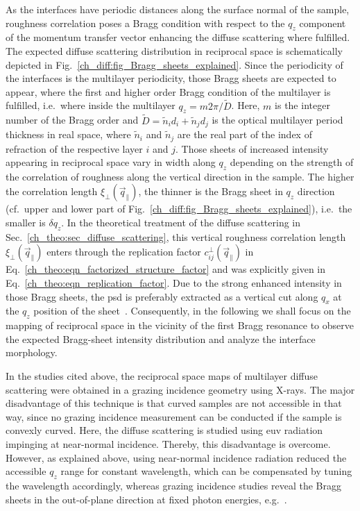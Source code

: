 As the interfaces have periodic distances along the surface normal of the sample, roughness correlation poses a Bragg condition with respect to the $q_z$ component of the momentum transfer vector enhancing the diffuse scattering where fulfilled. The expected diffuse scattering distribution in reciprocal space is schematically depicted in Fig.~\ref{ch_diff:fig_Bragg_sheets_explained}. Since the periodicity of the interfaces is the multilayer periodicity, those Bragg sheets are expected to appear, where the first and higher order Bragg condition of the multilayer is fulfilled, i.e.~where inside the multilayer $q_z=m 2 \pi /\tilde{D}$. Here, $m$ is the integer number of the Bragg order and $\tilde{D} = \tilde{n}_i d_i + \tilde{n}_j d_j$ is the optical multilayer period thickness in real space, where $\tilde{n}_i$ and $\tilde{n}_j$ are the real part of the index of refraction of the respective layer $i$ and $j$. Those sheets of increased intensity appearing in reciprocal space vary in width along $q_z$ depending on the strength of the correlation of roughness along the vertical direction in the sample. The higher the correlation length $\xi_\perp(\vec{q}_\parallel)$, the thinner is the Bragg sheet in $q_z$ direction (cf.~upper and lower part of Fig.~\ref{ch_diff:fig_Bragg_sheets_explained}), i.e.~the smaller is $\delta q_z$. In the theoretical treatment of the diffuse scattering in Sec.~\ref{ch_theo:sec_diffuse_scattering}, this vertical roughness correlation length $\xi_\perp(\vec{q}_\parallel)$ enters through the replication factor $c_{ij}^{\perp}(\vec{q}_\parallel)$ in Eq.~\eqref{ch_theo:eqn_factorized_structure_factor} and was explicitly given in Eq.~\eqref{ch_theo:eqn_replication_factor}. Due to the strong enhanced intensity in those Bragg sheets, the \gls{psd} is preferably extracted as a vertical cut along $q_x$ at the $q_z$ position of the sheet~\cite{salditt_kinetic_1994,siffalovic_characterization_2009}. Consequently, in the following we shall focus on the mapping of reciprocal space in the vicinity of the first Bragg resonance to observe the expected Bragg-sheet intensity distribution and analyze the interface morphology.

In the studies cited above, the reciprocal space maps of multilayer diffuse scattering were obtained in a grazing incidence geometry using X-rays. The major disadvantage of this technique is that curved samples are not accessible in that way, since no grazing incidence measurement can be conducted if the sample is convexly curved. Here, the diffuse scattering is studied using \gls{euv} radiation impinging at near-normal incidence. Thereby, this disadvantage is overcome. However, as explained above, using near-normal incidence radiation reduced the accessible $q_z$ range for constant wavelength, which can be compensated by tuning the wavelength accordingly, whereas grazing incidence studies reveal the Bragg sheets in the out-of-plane direction at fixed photon energies, e.g.~\textcite{siffalovic_characterization_2009}.

